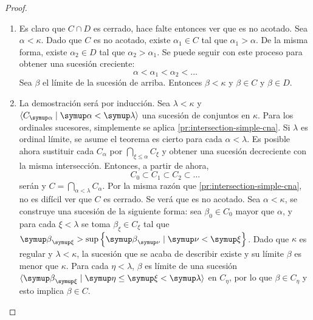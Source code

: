 \begin{proof}\phantom{a}
    \begin{enumerate}[label=(\roman*)]
        \item\label{pr:intersection-simple-cna}
            Es claro que $C\cap D$ es cerrado, hace falte entonces ver que es no acotado.
            Sea $\alpha<\kappa$. Dado que $C$ es no acotado, existe $\alpha_1\in C$
            tal que $\alpha_1 > \alpha$. De la misma forma, existe $\alpha_2\in D$
            tal que $\alpha_2 > \alpha_1$. Se puede seguir con este proceso para obtener
            una sucesión creciente:
            \[
                \alpha < \alpha_1 < \alpha_2 < \dots
            \]
            Sea $\beta$ el límite de la sucesión de arriba.
            Entonces $\beta < \kappa$ y $\beta\in C$ y $\beta\in D$.


        \item\label{pr:intersection-cna}
            La demostración será por inducción.
            Sea $\lambda<\kappa$ y $\seq{C_\alpha\mid\alpha<\lambda}$
            una sucesión de conjuntos \cna{} en $\kappa$.
            Para los ordinales sucesores, simplemente se aplica
            \ref{pr:intersection-simple-cna}.
            Si $\lambda$ es ordinal límite, se asume el teorema
            es cierto para cada $\alpha<\lambda$. Es posible ahora sustituir
            cada $C_\alpha$ por $\bigcap_{\xi\leq\alpha} C_\xi$ y obtener
            una sucesión decreciente con la misma intersección. Entonces, a partir de ahora,
            \[
                C_0 \subset C_1 \subset C_2 \subset \dots
            \]
            serán \cna{} y $C = \bigcap_{\alpha<\lambda} C_\alpha$.
            Por la misma razón que \ref{pr:intersection-simple-cna}, no es difícil
            ver que $C$ es cerrado. Se verá que es no acotado. Sea $\alpha<\kappa$,
            se construye una sucesión de la siguiente forma: sea $\beta_0\in C_0$ mayor que
            $\alpha$, y para cada $\xi<\lambda$ se toma $\beta_\xi\in C_\xi$
            tal que $\beta_\xi > \sup\set{\beta_\nu\mid\nu<\xi}$.
            Dado que $\kappa$ es regular y $\lambda<\kappa$, la sucesión que se acaba de
            describir existe y su límite $\beta$ es menor que $\kappa$.
            Para cada $\eta<\lambda$, $\beta$ es límite de una sucesión
            $\seq{\beta_\xi\mid\eta\leq\xi<\lambda}$ en $C_\eta$, por lo que
            $\beta\in C_\eta$ y esto implica $\beta\in C$.



\end{enumerate}
\end{proof}
